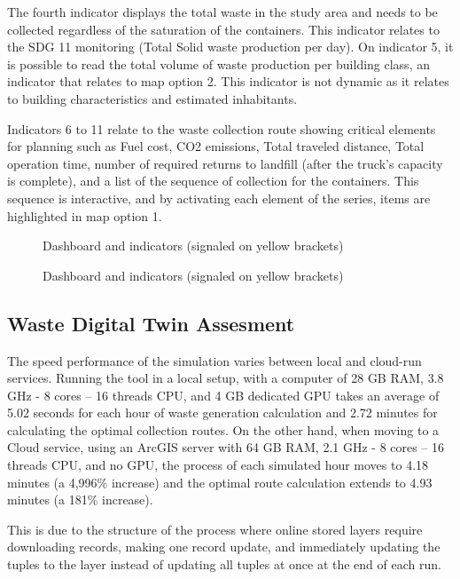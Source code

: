 \documentclass[authoryear,preprint,review,12pt]{elsarticle}
\begin{document}
    The fourth indicator displays the total waste in the study area and needs to be collected regardless of the saturation of the containers. This indicator relates to the SDG 11 monitoring (Total Solid waste production per day). On indicator 5, it is possible to read the total volume of waste production per building class, an indicator that relates to map option 2. This indicator is not dynamic as it relates to building characteristics and estimated inhabitants.

    Indicators 6 to 11 relate to the waste collection route showing critical elements for planning such as Fuel cost, CO2 emissions, Total traveled distance, Total operation time, number of required returns to landfill (after the truck's capacity is complete), and a list of the sequence of collection for the containers. This sequence is interactive, and by activating each element of the series, items are highlighted in map option 1.


    \begin{figure}
        \caption{Dashboard and indicators (signaled on yellow brackets)}
        \label{fig:indicators1}
    \end{figure}


    \begin{figure}
        \caption{Dashboard and indicators (signaled on yellow brackets)}
        \label{fig:indicators2}
    \end{figure}

    \subsection{Waste Digital Twin Assesment} \label{subsec:Assesment}
    The speed performance of the simulation varies between local and cloud-run services. Running the tool in a local setup, with a computer of 28 GB RAM, 3.8 GHz - 8 cores – 16 threads CPU, and 4 GB dedicated GPU takes an average of 5.02 seconds for each hour of waste generation calculation and 2.72 minutes for calculating the optimal collection routes. On the other hand, when moving to a Cloud service, using an ArcGIS server with 64 GB RAM, 2.1 GHz - 8 cores – 16 threads CPU, and no GPU, the process of each simulated hour moves to 4.18 minutes (a 4,996\% increase) and the optimal route calculation extends to 4.93 minutes (a 181\% increase).

    This is due to the structure of the process where online stored layers require downloading records, making one record update, and immediately updating the tuples to the layer instead of updating all tuples at once at the end of each run.
\end{document}
